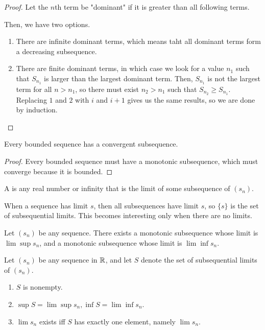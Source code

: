 \documentclass{book}
\begin{document}
\begin{proof}
    Let the $n$th term be "dominant" if it is greater than all following terms.

    Then, we have two options.
    \begin{enumerate}
        \item There are infinite dominant terms, which means taht all dominant terms form a decreasing subsequence.
        \item There are finite dominant terms, in which case we look for a value $n_1$ such that $S_{n_1}$ is larger than the largest dominant term. Then, $S_{n_1}$ is not the largest term for all $n > n_1$, so there must exist $n_2 > n_1$ such that $S_{n_2} \geq S_{n_1}$. Replacing $1$ and $2$ with $i$ and $i+1$ gives us the same results, so we are done by induction.
    \end{enumerate}
\end{proof}

\begin{thm}
    Every bounded sequence has a convergent subsequence.
\end{thm}

\begin{proof}
    Every bounded sequence must have a monotonic subsequence, which must converge because it is bounded.
\end{proof}

\begin{defn}
    A  is any real number or infinity that is the limit of some subsequence of $(s_n)$.
\end{defn}

When a sequence has limit $s$, then all subsequences have limit $s$, so $\{s\}$ is the set of subsequential limits. This becomes interesting only when there are no limits.

\begin{thm}
    Let $(s_n)$ be any sequence. There exists a monotonic subsequence whose limit is $\lim \sup s_n$, and a monotonic subsequence whose limit is $\lim \inf s_n$.
\end{thm}

\begin{thm}
    Let $(s_n)$ be any sequence in $\mathbb{R}$, and let $S$ denote the set of subsequential limits of $(s_n)$.

    \begin{enumerate}[label=(\roman*)]
        \item $S$ is nonempty.
        \item $\sup S = \lim \sup s_n, \inf S = \lim \inf s_n$.
        \item $\lim s_n$ exists iff $S$ has exactly one element, namely $\lim s_n$.
    \end{enumerate}
\end{thm}
\end{document}
